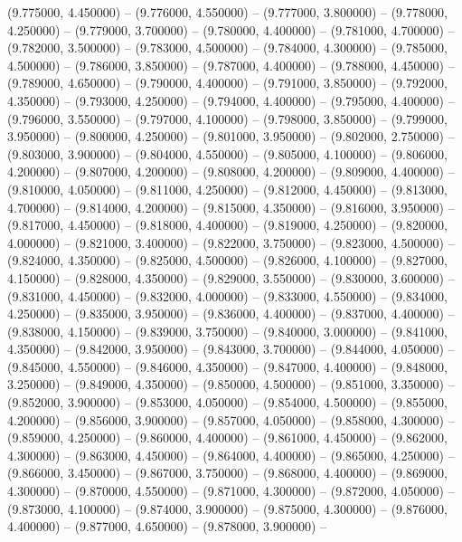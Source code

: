 (9.775000, 4.450000) -- 
(9.776000, 4.550000) -- 
(9.777000, 3.800000) -- 
(9.778000, 4.250000) -- 
(9.779000, 3.700000) -- 
(9.780000, 4.400000) -- 
(9.781000, 4.700000) -- 
(9.782000, 3.500000) -- 
(9.783000, 4.500000) -- 
(9.784000, 4.300000) -- 
(9.785000, 4.500000) -- 
(9.786000, 3.850000) -- 
(9.787000, 4.400000) -- 
(9.788000, 4.450000) -- 
(9.789000, 4.650000) -- 
(9.790000, 4.400000) -- 
(9.791000, 3.850000) -- 
(9.792000, 4.350000) -- 
(9.793000, 4.250000) -- 
(9.794000, 4.400000) -- 
(9.795000, 4.400000) -- 
(9.796000, 3.550000) -- 
(9.797000, 4.100000) -- 
(9.798000, 3.850000) -- 
(9.799000, 3.950000) -- 
(9.800000, 4.250000) -- 
(9.801000, 3.950000) -- 
(9.802000, 2.750000) -- 
(9.803000, 3.900000) -- 
(9.804000, 4.550000) -- 
(9.805000, 4.100000) -- 
(9.806000, 4.200000) -- 
(9.807000, 4.200000) -- 
(9.808000, 4.200000) -- 
(9.809000, 4.400000) -- 
(9.810000, 4.050000) -- 
(9.811000, 4.250000) -- 
(9.812000, 4.450000) -- 
(9.813000, 4.700000) -- 
(9.814000, 4.200000) -- 
(9.815000, 4.350000) -- 
(9.816000, 3.950000) -- 
(9.817000, 4.450000) -- 
(9.818000, 4.400000) -- 
(9.819000, 4.250000) -- 
(9.820000, 4.000000) -- 
(9.821000, 3.400000) -- 
(9.822000, 3.750000) -- 
(9.823000, 4.500000) -- 
(9.824000, 4.350000) -- 
(9.825000, 4.500000) -- 
(9.826000, 4.100000) -- 
(9.827000, 4.150000) -- 
(9.828000, 4.350000) -- 
(9.829000, 3.550000) -- 
(9.830000, 3.600000) -- 
(9.831000, 4.450000) -- 
(9.832000, 4.000000) -- 
(9.833000, 4.550000) -- 
(9.834000, 4.250000) -- 
(9.835000, 3.950000) -- 
(9.836000, 4.400000) -- 
(9.837000, 4.400000) -- 
(9.838000, 4.150000) -- 
(9.839000, 3.750000) -- 
(9.840000, 3.000000) -- 
(9.841000, 4.350000) -- 
(9.842000, 3.950000) -- 
(9.843000, 3.700000) -- 
(9.844000, 4.050000) -- 
(9.845000, 4.550000) -- 
(9.846000, 4.350000) -- 
(9.847000, 4.400000) -- 
(9.848000, 3.250000) -- 
(9.849000, 4.350000) -- 
(9.850000, 4.500000) -- 
(9.851000, 3.350000) -- 
(9.852000, 3.900000) -- 
(9.853000, 4.050000) -- 
(9.854000, 4.500000) -- 
(9.855000, 4.200000) -- 
(9.856000, 3.900000) -- 
(9.857000, 4.050000) -- 
(9.858000, 4.300000) -- 
(9.859000, 4.250000) -- 
(9.860000, 4.400000) -- 
(9.861000, 4.450000) -- 
(9.862000, 4.300000) -- 
(9.863000, 4.450000) -- 
(9.864000, 4.400000) -- 
(9.865000, 4.250000) -- 
(9.866000, 3.450000) -- 
(9.867000, 3.750000) -- 
(9.868000, 4.400000) -- 
(9.869000, 4.300000) -- 
(9.870000, 4.550000) -- 
(9.871000, 4.300000) -- 
(9.872000, 4.050000) -- 
(9.873000, 4.100000) -- 
(9.874000, 3.900000) -- 
(9.875000, 4.300000) -- 
(9.876000, 4.400000) -- 
(9.877000, 4.650000) -- 
(9.878000, 3.900000) -- 
